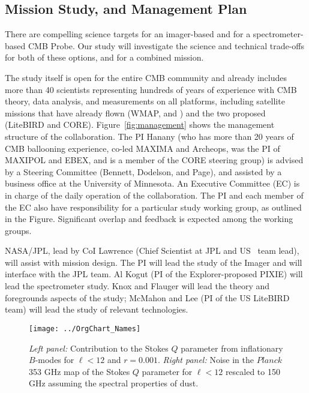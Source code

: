 
\subsection{Mission Study, and Management Plan  }
\label{sec:management}

\vspace{-0.05in}


There are compelling science targets for an imager-based and for 
a spectrometer-based CMB Probe. Our study will investigate the science and technical trade-offs 
for both of these options, and for a combined mission. 

The study itself is open for the entire CMB community and already includes more than 40 scientists representing 
hundreds of years of experience with CMB theory, data analysis, and measurements on all platforms, including satellite missions
that have already flown (WMAP, and \planck ) and the two proposed (LiteBIRD and CORE). 
Figure~\ref{fig:management} shows the management structure of the collaboration. The PI Hanany (who has more 
than 20 years of CMB ballooning experience, co-led MAXIMA and Archeops, was the PI of MAXIPOL and EBEX, and 
is a member of the CORE steering group) 
is advised by a Steering Committee (Bennett, Dodelson, and Page), and assisted by a business office at the University 
of Minnesota.  An Executive Committee (EC) is in charge of the daily operation of the collaboration. The PI and each member of the 
EC also have responsibility for a particular study working group, as outlined in the Figure. Significant overlap and feedback is 
expected among the working groups. 

NASA/JPL, lead by CoI Lawrence (Chief Scientist 
at JPL and US \planck\ team lead), will assist with mission design. The PI will lead the study of the Imager and will interface with 
the JPL team. Al Kogut (PI of the Explorer-proposed PIXIE) will lead the spectrometer study. Knox and Flauger will lead the theory and 
foregrounds aspects of the study; McMahon and Lee (PI of the US LiteBIRD team) will lead the study of relevant technologies.  

\begin{figure}[ht!]
\begin{center}
\texttt{[image: ../OrgChart\_Names]}
\end{center}
\caption{{\it Left panel:} Contribution to the Stokes $Q$ parameter
  from inflationary $B$-modes for $\ell<12$ and $r=0.001$. {\it Right
    panel:} Noise in the $Planck$ 353 GHz map of the Stokes $Q$
  parameter for $\ell<12$ rescaled to 150\,GHz assuming the spectral
  properties of dust.}
\label{fig:Qrp001}
\end{figure}

